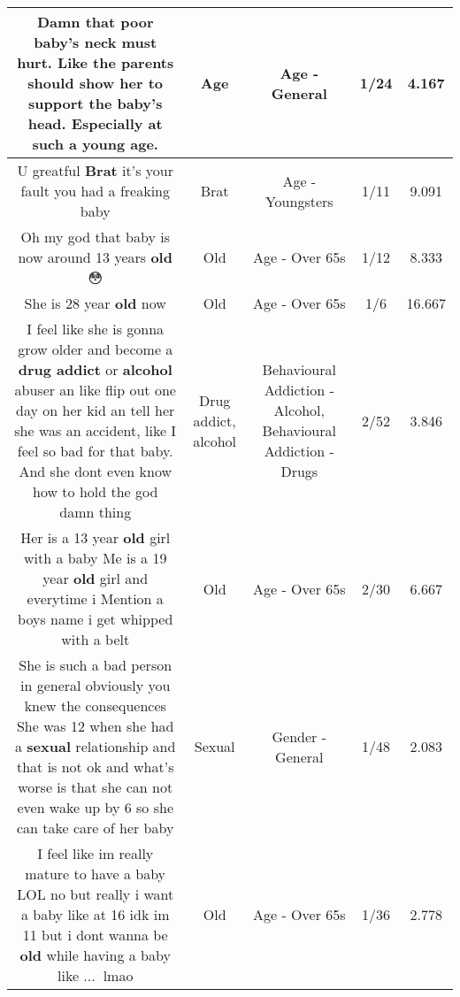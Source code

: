 \documentclass[11pt]{article}
\newlength\mylength
\begin{document}
\begin{center}
\begin{longtable}{|C{.65\mylength}|C{.30\mylength}|C{.12\mylength}|C{.12\mylength}|C{.12\mylength}|}
  \small Damn that poor baby's neck must hurt. Like the parents should show her to support the baby's head. Especially at such a young \textbf{age}.\normalsize   & Age & Age - General & 1/24 & 4.167 \\  \hline
  \small U greatful \textbf{Brat} it's your fault you had a freaking baby\normalsize   & Brat & Age - Youngsters & 1/11 & 9.091 \\  \hline
  \small Oh my god that baby is now around 13 years \textbf{old} 😳\normalsize   & Old & Age - Over 65s & 1/12 & 8.333 \\  \hline
  \small She is 28 year \textbf{old} now\normalsize   & Old & Age - Over 65s & 1/6 & 16.667 \\  \hline
  \small I feel like she is gonna grow older and become a \textbf{drug addict} or \textbf{alcohol} abuser an like flip out one day on her kid an tell her she was an accident, like I feel so bad for that baby. And she dont even know how to hold the god damn thing\normalsize   & Drug addict, alcohol & Behavioural Addiction - Alcohol, Behavioural Addiction - Drugs & 2/52 & 3.846 \\  \hline
  \small Her is a 13 year \textbf{old} girl with a baby Me is a 19 year \textbf{old} girl and everytime i Mention a boys name i get whipped with a belt\normalsize   & Old & Age - Over 65s & 2/30 & 6.667 \\  \hline
  \small She is such a bad person in general obviously you knew the consequences She was 12 when she had a \textbf{sexual} relationship  and that is not ok and what's worse is that she can not even wake up by 6 so she can take care of her baby\normalsize   & Sexual & Gender - General & 1/48 & 2.083 \\  \hline
  \small I feel like im really mature to have a baby LOL no but really i want a baby like at 16 idk im 11 but i dont wanna be \textbf{old} while having a baby like ...💁🏻lmao\normalsize   & Old & Age - Over 65s & 1/36 & 2.778 \\  \hline

\end{longtable}
\end{center}
\end{document}
